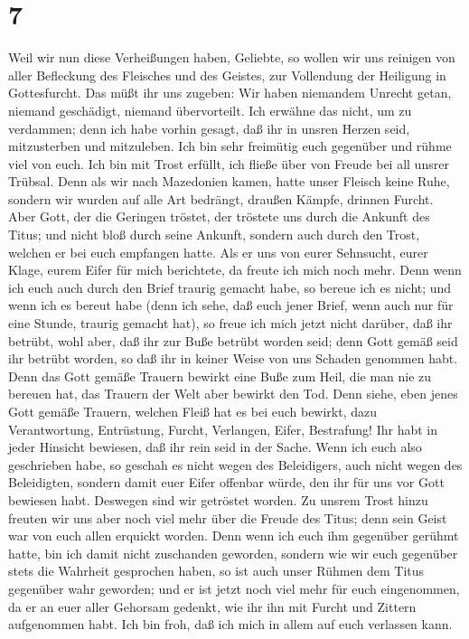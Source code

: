 \hypertarget{section-6}{%
\section{7}\label{section-6}}

 Weil wir nun diese Verheißungen haben, Geliebte, so
wollen wir uns reinigen von aller Befleckung des Fleisches und des
Geistes, zur Vollendung der Heiligung in Gottesfurcht. 
Das müßt ihr uns zugeben: Wir haben niemandem Unrecht getan, niemand
geschädigt, niemand übervorteilt.  Ich erwähne das nicht,
um zu verdammen; denn ich habe vorhin gesagt, daß ihr in unsren Herzen
seid, mitzusterben und mitzuleben.  Ich bin sehr freimütig
euch gegenüber und rühme viel von euch. Ich bin mit Trost erfüllt, ich
fließe über von Freude bei all unsrer Trübsal.  Denn als
wir nach Mazedonien kamen, hatte unser Fleisch keine Ruhe, sondern wir
wurden auf alle Art bedrängt, draußen Kämpfe, drinnen Furcht.
 Aber Gott, der die Geringen tröstet, der tröstete uns
durch die Ankunft des Titus;  und nicht bloß durch seine
Ankunft, sondern auch durch den Trost, welchen er bei euch empfangen
hatte. Als er uns von eurer Sehnsucht, eurer Klage, eurem Eifer für mich
berichtete, da freute ich mich noch mehr.  Denn wenn ich
euch auch durch den Brief traurig gemacht habe, so bereue ich es nicht;
und wenn ich es bereut habe (denn ich sehe, daß euch jener Brief, wenn
auch nur für eine Stunde, traurig gemacht hat),  so freue
ich mich jetzt nicht darüber, daß ihr betrübt, wohl aber, daß ihr zur
Buße betrübt worden seid; denn Gott gemäß seid ihr betrübt worden, so
daß ihr in keiner Weise von uns Schaden genommen habt. 
Denn das Gott gemäße Trauern bewirkt eine Buße zum Heil, die man nie zu
bereuen hat, das Trauern der Welt aber bewirkt den Tod. 
Denn siehe, eben jenes Gott gemäße Trauern, welchen Fleiß hat es bei
euch bewirkt, dazu Verantwortung, Entrüstung, Furcht, Verlangen, Eifer,
Bestrafung! Ihr habt in jeder Hinsicht bewiesen, daß ihr rein seid in
der Sache.  Wenn ich euch also geschrieben habe, so
geschah es nicht wegen des Beleidigers, auch nicht wegen des
Beleidigten, sondern damit euer Eifer offenbar würde, den ihr für uns
vor Gott bewiesen habt.  Deswegen sind wir getröstet
worden. Zu unsrem Trost hinzu freuten wir uns aber noch viel mehr über
die Freude des Titus; denn sein Geist war von euch allen erquickt
worden.  Denn wenn ich euch ihm gegenüber gerühmt hatte,
bin ich damit nicht zuschanden geworden, sondern wie wir euch gegenüber
stets die Wahrheit gesprochen haben, so ist auch unser Rühmen dem Titus
gegenüber wahr geworden;  und er ist jetzt noch viel mehr
für euch eingenommen, da er an euer aller Gehorsam gedenkt, wie ihr ihn
mit Furcht und Zittern aufgenommen habt.  Ich bin froh,
daß ich mich in allem auf euch verlassen kann.

